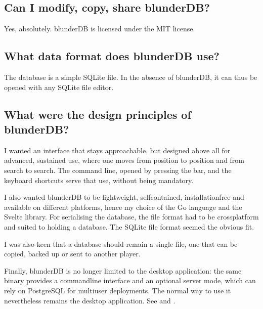 \documentclass[letterpaper,10pt,english]{sphinxmanual}
\begin{document}
\subsection{Can I modify, copy, share blunderDB?}
\label{\detokenize{faq:puis-je-modifier-copier-partager-blunderdb}}
\sphinxAtStartPar
Yes, absolutely. blunderDB is licensed under the MIT license.


\subsection{What data format does blunderDB use?}
\label{\detokenize{faq:quel-format-de-donnees-utilise-blunderdb}}
\sphinxAtStartPar
The database is a simple SQLite file. In the absence of blunderDB, it can thus be opened with any SQLite file editor.


\subsection{What were the design principles of blunderDB?}
\label{\detokenize{faq:quelles-ont-ete-les-principes-de-conception-de-blunderdb}}
\sphinxAtStartPar
I wanted an interface that stays approachable, but designed above all for advanced, sustained use, where one moves from position to position and from search to search. The command line, opened by pressing the  bar, and the keyboard shortcuts serve that use, without being mandatory.

\sphinxAtStartPar
I also wanted blunderDB to be lightweight, self\sphinxhyphen{}contained, installation\sphinxhyphen{}free and available on different platforms, hence my choice of the Go language and the Svelte library. For serialising the database, the file format had to be cross\sphinxhyphen{}platform and suited to holding a database. The SQLite file format seemed the obvious fit.

\sphinxAtStartPar
I was also keen that a database should remain a single file, one that can be copied, backed up or sent to another player.

\sphinxAtStartPar
Finally, blunderDB is no longer limited to the desktop application: the same binary provides a command\sphinxhyphen{}line interface and an optional server mode, which can rely on PostgreSQL for multi\sphinxhyphen{}user deployments. The normal way to use it nevertheless remains the desktop application. See {\hyperref[\detokenize{cli:cli}]{}} and {\hyperref[\detokenize{mode_headless:headless}]{}}.
\end{document}
